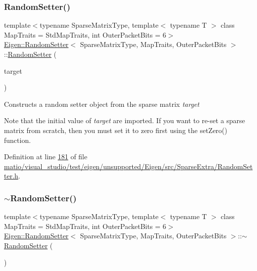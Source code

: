 \subsubsection{\texorpdfstring{Random\+Setter()}{RandomSetter()}\hspace{0.1cm}{\footnotesize\ttfamily [2/2]}}
{\footnotesize\ttfamily template$<$typename Sparse\+Matrix\+Type, template$<$ typename T $>$ class Map\+Traits = Std\+Map\+Traits, int Outer\+Packet\+Bits = 6$>$ \\
\hyperlink{class_eigen_1_1_random_setter}{Eigen\+::\+Random\+Setter}$<$ Sparse\+Matrix\+Type, Map\+Traits, Outer\+Packet\+Bits $>$\+::\hyperlink{class_eigen_1_1_random_setter}{Random\+Setter} (\begin{DoxyParamCaption}\item[{Sparse\+Matrix\+Type \&}]{target }\end{DoxyParamCaption})\hspace{0.3cm}{\ttfamily [inline]}}

Constructs a random setter object from the sparse matrix {\itshape target} 

Note that the initial value of {\itshape target} are imported. If you want to re-\/set a sparse matrix from scratch, then you must set it to zero first using the set\+Zero() function. 

Definition at line \hyperlink{matio_2visual__studio_2test_2eigen_2unsupported_2_eigen_2src_2_sparse_extra_2_random_setter_8h_source_l00181}{181} of file \hyperlink{matio_2visual__studio_2test_2eigen_2unsupported_2_eigen_2src_2_sparse_extra_2_random_setter_8h_source}{matio/visual\+\_\+studio/test/eigen/unsupported/\+Eigen/src/\+Sparse\+Extra/\+Random\+Setter.\+h}.

\mbox{\label{class_eigen_1_1_random_setter_a3e4a78672df59ab4dd2799919b431027}} 
\subsubsection{\texorpdfstring{$\sim$\+Random\+Setter()}{~RandomSetter()}\hspace{0.1cm}{\footnotesize\ttfamily [2/2]}}
{\footnotesize\ttfamily template$<$typename Sparse\+Matrix\+Type, template$<$ typename T $>$ class Map\+Traits = Std\+Map\+Traits, int Outer\+Packet\+Bits = 6$>$ \\
\hyperlink{class_eigen_1_1_random_setter}{Eigen\+::\+Random\+Setter}$<$ Sparse\+Matrix\+Type, Map\+Traits, Outer\+Packet\+Bits $>$\+::$\sim$\hyperlink{class_eigen_1_1_random_setter}{Random\+Setter} (\begin{DoxyParamCaption}{ }\end{DoxyParamCaption})\hspace{0.3cm}{\ttfamily [inline]}}

